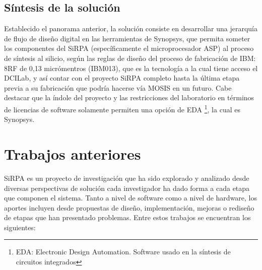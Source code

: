 \subsection{Síntesis de la solución}
Establecido el panorama anterior, la solución consiste en desarrollar una jerarquía de flujo de diseño digital en las herramientas de Synopsys, que permita someter los componentes del SiRPA (específicamente el microprocesador ASP) al proceso de síntesis al silicio, según las reglas de diseño del proceso de fabricación de IBM: 8RF de 0,13 micrómentros (IBM013), que es la tecnología a la cual tiene acceso el DCILab, y así contar con el proyecto SiRPA completo hasta la última etapa previa a su fabricación que podría hacerse vía MOSIS en un futuro.
Cabe destacar que la índole del proyecto y las restricciones del laboratorio en términos de licencias de software solamente permiten una opción de EDA \footnote{EDA: Electronic Design Automation. Software usado en la síntesis de circuitos integrados}, la cual es Synopsys.

\section{Trabajos anteriores}

SiRPA es un proyecto de investigación que ha sido explorado y analizado desde diversas perspectivas de solución cada investigador ha dado forma a cada etapa que componen el sistema. Tanto a nivel de software como a nivel de hardware, los aportes incluyen desde propuestas de diseño, implementación, mejoras o rediseño de etapas que han presentado problemas. Entre estos trabajos se encuentran los siguientes:

